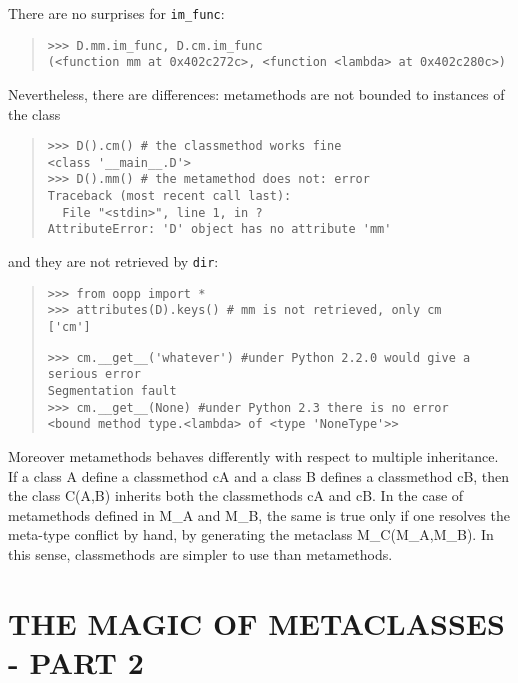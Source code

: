 \documentclass[10pt,english]{article}
\begin{document}
There are no surprises for \texttt{im{\_}func}:
\begin{quote}
\begin{verbatim}>>> D.mm.im_func, D.cm.im_func
(<function mm at 0x402c272c>, <function <lambda> at 0x402c280c>)\end{verbatim}
\end{quote}

Nevertheless, there are differences: metamethods are not bounded to
instances of the class
\begin{quote}
\begin{verbatim}>>> D().cm() # the classmethod works fine
<class '__main__.D'>
>>> D().mm() # the metamethod does not: error
Traceback (most recent call last):
  File "<stdin>", line 1, in ?
AttributeError: 'D' object has no attribute 'mm'\end{verbatim}
\end{quote}

and they are not retrieved by \texttt{dir}:
\begin{quote}
\begin{verbatim}>>> from oopp import *
>>> attributes(D).keys() # mm is not retrieved, only cm
['cm']\end{verbatim}
\begin{verbatim}>>> cm.__get__('whatever') #under Python 2.2.0 would give a serious error
Segmentation fault
>>> cm.__get__(None) #under Python 2.3 there is no error
<bound method type.<lambda> of <type 'NoneType'>>\end{verbatim}
\end{quote}

Moreover metamethods behaves differently with respect to multiple
inheritance. If a class A define a classmethod cA and a class B
defines a classmethod cB, then the class C(A,B) inherits both the
classmethods cA and cB. In the case of metamethods defined in M{\_}A
and M{\_}B, the same is true only if one resolves the meta-type
conflict by hand, by generating the metaclass M{\_}C(M{\_}A,M{\_}B). In this
sense, classmethods are simpler to use than metamethods.



\hypertarget{the-magic-of-metaclasses-part-2}{}
\section*{THE MAGIC OF METACLASSES - PART 2}
\end{document}
